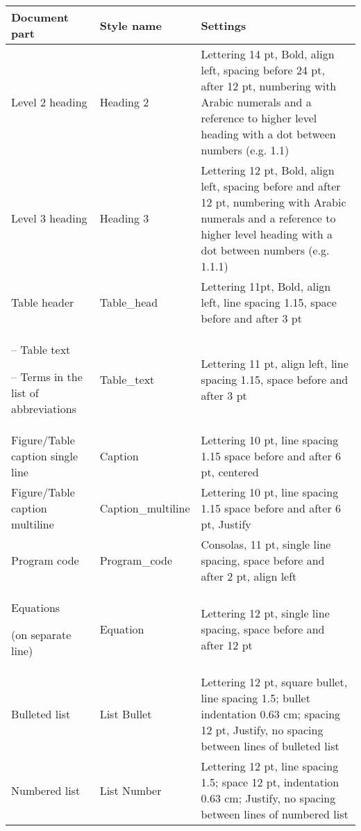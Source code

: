 \begin{table}[!ht]
\centering
\begin{tabular}{|L{3.7cm}|L{3.0cm}|L{7.2cm}|}
\hline
\textbf{Document part} & \textbf{Style name} & \textbf{Settings}\\  \hline

Level 2 heading & Heading 2 & Lettering 14 pt, Bold, align left, spacing before 
24 pt, after 12 pt, numbering with Arabic
numerals and a reference to higher level
heading with a dot between numbers (e.g. 1.1) \\ \hline
Level 3 heading & Heading 3 &Lettering 12 pt, Bold, align left, spacing before
and after 12 pt, numbering with Arabic
numerals and a reference to higher level
heading with a dot between numbers
(e.g. 1.1.1) \\ \hline
Table header &Table\_head & Lettering 11pt, Bold, align left, line spacing
1.15, space before and after 3 pt \\ \hline

-- Table text

-- Terms in the list of 
abbreviations & Table\_text & Lettering 11 pt, align left, line spacing 1.15,
space before and after 3 pt \\ \hline

Figure/Table caption
single line & Caption & Lettering 10 pt, line spacing 1.15
space before and after 6 pt, centered \\ \hline

Figure/Table caption  
multiline & Caption\_multiline & Lettering 10 pt, line spacing 1.15
space before and after 6 pt, Justify \\ \hline

Program code & Program\_code & Consolas, 11 pt, single line spacing,
space before and after 2 pt, align left \\ \hline

Equations 

(on separate line) & Equation & Lettering 12 pt, single line spacing, space before and after 12 pt \\ \hline

Bulleted list & List Bullet & Lettering 12 pt, square bullet, line spacing 1.5;
bullet indentation 0.63 cm; spacing 12 pt,
Justify, no spacing between lines of bulleted
list \\ \hline

Numbered list & List Number & Lettering 12 pt, line spacing 1.5; space 12 pt,
indentation 0.63 cm; Justify, no spacing
between lines of numbered list \\ \hline


\end{tabular}
\end{table}

